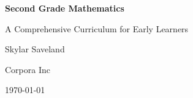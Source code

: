 \begin{titlepage}
    \centering
    \vspace*{1in}
    {\Huge\bfseries Second Grade Mathematics\par}
    {\Large A Comprehensive Curriculum for Early Learners\par}
    \vspace{1in}
    {\Large Skylar Saveland\par}
    {\Large Corpora Inc\par}
    \vfill
    {\large \today\par}
\end{titlepage}
